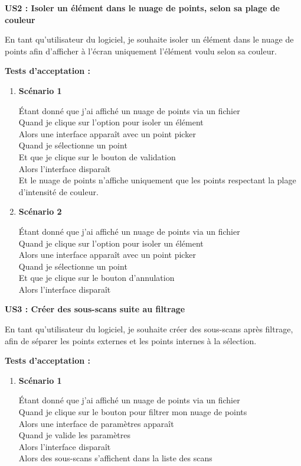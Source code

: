 \documentclass[12pt,titlepage,french]{article}
\begin{document}
\textbf{\og US2 : Isoler un élément dans le nuage de points, selon sa plage de couleur\fg{}}

En tant qu'utilisateur du logiciel, je souhaite isoler un élément dans le nuage de points afin d'afficher à l'écran uniquement l'élément voulu selon sa couleur.

\textbf{Tests d'acceptation :}
\begin{enumerate}

    \item \textbf{Scénario 1}

Étant donné que j'ai affiché un nuage de points via un fichier\\
Quand je clique sur l'option pour isoler un élément\\
Alors une interface apparaît avec un point picker\\
Quand je sélectionne un point\\
Et que je clique sur le bouton de validation\\
Alors l'interface disparaît\\
Et le nuage de points n'affiche uniquement que les points respectant la plage d'intensité de couleur.

    \item \textbf{Scénario 2}

Étant donné que j'ai affiché un nuage de points via un fichier\\
Quand je clique sur l'option pour isoler un élément\\
Alors une interface apparaît avec un point picker\\
Quand je sélectionne un point\\
Et que je clique sur le bouton d'annulation\\
Alors l'interface disparaît\\
\end{enumerate}

\textbf{\og US3 : Créer des sous-scans suite au filtrage\fg{}}

En tant qu'utilisateur du logiciel, je souhaite créer des sous-scans après filtrage, afin de séparer les points externes et les points internes à la sélection.

\textbf{Tests d'acceptation :}
\begin{enumerate}

    \item \textbf{Scénario 1}

Étant donné que j'ai affiché un nuage de points via un fichier\\
Quand je clique sur le bouton pour filtrer mon nuage de points\\
Alors une interface de paramètres apparaît\\
Quand je valide les paramètres\\
Alors l'interface disparaît\\
Alors des sous-scans s'affichent dans la liste des scans
\end{enumerate}
\end{document}
